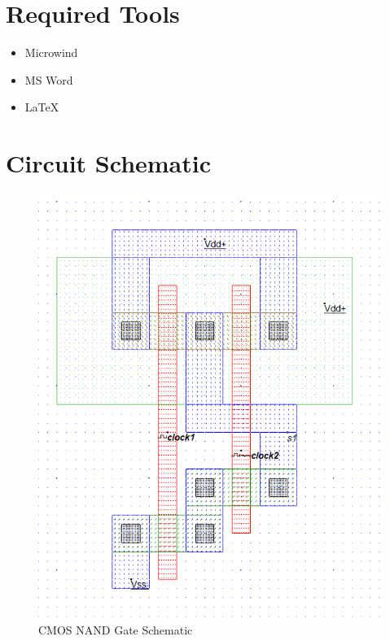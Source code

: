 \documentclass[12pt]{article}
\begin{document}
\section*{Required Tools}
\begin{itemize}
    \item Microwind
    \item MS Word
    \item \LaTeX
\end{itemize}

\section*{Circuit Schematic}

\begin{figure}[H]
    \centering
    \begin{minipage}{0.48\textwidth}
        \centering
        \includegraphics[width=\textwidth]{3Nand.png}
        \caption{CMOS NAND Gate Schematic}
    \end{minipage}\hfill

\end{figure}
\end{document}
